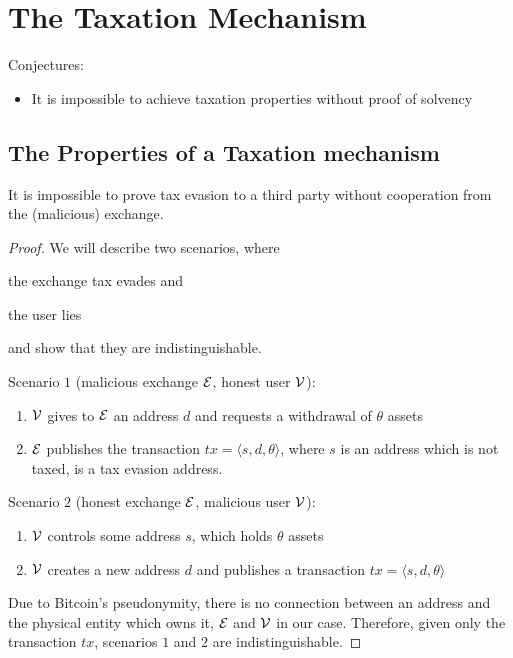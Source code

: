 \section{The Taxation Mechanism}\label{sec:taxation}

Conjectures:
\begin{itemize}
    \item It is impossible to achieve taxation properties without proof of solvency
\end{itemize}

\subsection{The Properties of a Taxation mechanism}\label{subsec:taxation-properties}

\begin{proposition}\label{prop:tax-proof-impossibility}
    It is impossible to prove tax evasion to a third party without cooperation
    from the (malicious) exchange.
\end{proposition}
\begin{proof}
    We will describe two scenarios, where
    \begin{inparaenum}
        \item the exchange tax evades and
        \item the user lies
    \end{inparaenum}
    and show that they are indistinguishable.

    Scenario $1$ (malicious exchange $\mathcal{E}$, honest user $\mathcal{V}$):
    \begin{enumerate}
        \item $\mathcal{V}$ gives to $\mathcal{E}$ an address $d$ and requests a
            withdrawal of $\theta$ assets
        \item $\mathcal{E}$ publishes the transaction $tx = \langle s, d, \theta
            \rangle$, where $s$ is an address which is not taxed, \ie is a tax
            evasion address.
    \end{enumerate}

    Scenario $2$ (honest exchange $\mathcal{E}$, malicious user $\mathcal{V}$):
    \begin{enumerate}
        \item $\mathcal{V}$ controls some address $s$, which holds $\theta$ assets
        \item $\mathcal{V}$ creates a new address $d$ and publishes a transaction
            $tx = \langle s, d, \theta \rangle$
    \end{enumerate}

    Due to Bitcoin's pseudonymity, there is no connection between an address
    and the physical entity which owns it, \ie $\mathcal{E}$ and $\mathcal{V}$ in our
    case. Therefore, given only the transaction $tx$, scenarios $1$ and $2$ are
    indistinguishable.
\end{proof}

